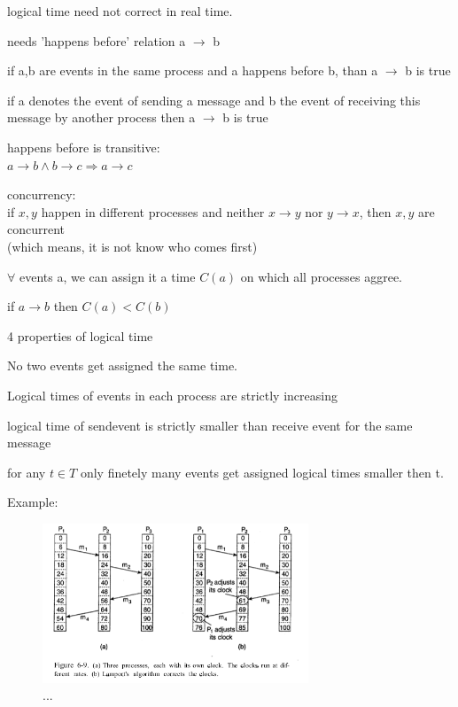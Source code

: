 \documentclass[ngerman,a4paper]{report}
\begin{document}
\begin{compactitem}
\item logical time need not correct in real time.
\item needs 'happens before' relation a $\rightarrow$ b

\begin{compactenum}
\item if a,b are events in the same process and a happens before b, than a $\rightarrow$ b is true
\item if a denotes the event of sending a message and b the event of receiving this message by another process then a $\rightarrow$ b is true 
\end{compactenum}

\item happens before is transitive:\\
$a \rightarrow b \land b \rightarrow c \Rightarrow a \rightarrow c$
\item concurrency:\\
if $x, y$ happen in different processes and neither $x \rightarrow y$ nor $y \rightarrow x$, then $x, y$ are concurrent\\
(which means, it is not know who comes first)
\item $\forall$ events a, we can assign it a time $C(a)$ on which all processes aggree.
\item if $a \rightarrow b$ then $C(a) < C(b)$ 
\item 4 properties of logical time
\begin{compactenum}
\item No two events get assigned the same time.
\item Logical times of events in each process are strictly increasing
\item logical time of sendevent is strictly smaller than receive event for the same message
\item for any $t \in T$ only finetely many events get assigned logical times smaller then  t.
\end{compactenum}
\item Example:

\begin{figure}[h]
	\centering
	\includegraphics[width=300px]{gfx/lamport.png}
	\caption{...}
	\label{img:lamport}
\end{figure}

\end{compactitem}
\end{document}

